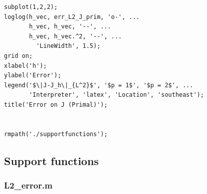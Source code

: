 \documentclass{article}
\begin{document}
\begin{lstlisting}[style=matlab-editor]
% --- Subplot 2: Errore su J (Primal) ---
subplot(1,2,2);
loglog(h_vec, err_L2_J_prim, 'o-', ...
       h_vec, h_vec, '--', ...
       h_vec, h_vec.^2, '--', ...
         'LineWidth', 1.5);
grid on;
xlabel('h');
ylabel('Error');
legend('$\|J-J_h\|_{L^2}$', '$p = 1$', '$p = 2$', ...
       'Interpreter', 'latex', 'Location', 'southeast');
title('Error on J (Primal)');


rmpath('./supportfunctions');
\end{lstlisting}

\subsection{Support functions}
    \subsubsection{L2\_error.m}
\end{document}
